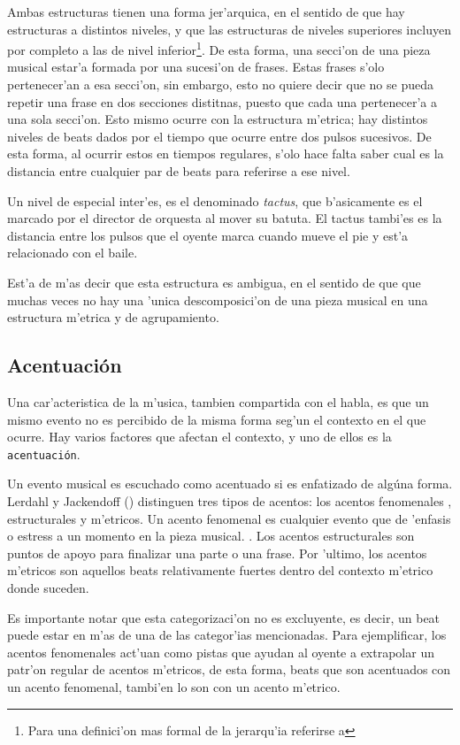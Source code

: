 Ambas estructuras tienen una forma jer'arquica, en el sentido de que hay estructuras a distintos niveles, y que las estructuras de niveles superiores 
incluyen por completo a las de nivel inferior\footnote{Para una definici'on mas formal de la jerarqu'ia referirse a \cita}. De esta forma, una secci'on
de una pieza musical estar'a formada por una sucesi'on de frases. Estas frases s'olo pertenecer'an a esa secci'on, sin embargo, esto no quiere decir
que no se pueda repetir una frase en dos secciones distitnas, puesto que cada una pertenecer'a a una sola secci'on. 
Esto mismo ocurre con la estructura m'etrica; hay distintos niveles de beats dados por el tiempo que ocurre entre dos pulsos sucesivos. De esta forma, al 
ocurrir estos en tiempos regulares, s'olo hace falta saber cual es la distancia entre cualquier par de beats para referirse a ese nivel. 

Un nivel de especial inter'es, es el denominado \emph{tactus}, que b'asicamente es el marcado por el director de orquesta al mover su batuta. 
El tactus tambi'es es la distancia entre los pulsos que el oyente marca cuando mueve el pie y est'a relacionado con el baile. 

Est'a de m'as decir que esta estructura es ambigua, en el sentido de que que muchas veces no hay una 'unica descomposici'on de una pieza musical 
en una estructura m'etrica y de agrupamiento.


\subsection{Acentuaci\'on}
Una car'acteristica de la m'usica, tambien compartida con el habla, es que un mismo evento no es percibido de la misma forma seg'un
el contexto en el que ocurre. Hay varios factores que afectan el contexto, y uno de ellos es la \texttt{acentuaci\'on}. 

Un evento musical es escuchado como acentuado si es enfatizado de alg\'una forma. Lerdahl y Jackendoff (\cita) distinguen tres tipos de 
acentos: los acentos fenomenales , estructurales y m'etricos.
Un acento fenomenal es cualquier evento que de 'enfasis o estress a un momento en la pieza musical. . Los acentos estructurales son puntos de apoyo para finalizar una parte o una frase. 
Por 'ultimo, los acentos m'etricos son aquellos beats relativamente fuertes dentro del contexto m'etrico donde suceden.\newline
{} 

Es importante notar que esta categorizaci'on no es excluyente, es decir, un beat puede estar en m'as de una de las categor'ias mencionadas.
Para ejemplificar, los acentos fenomenales act'uan como pistas que ayudan al oyente a extrapolar un patr'on regular de acentos m'etricos, 
de esta forma, beats que son acentuados con un acento fenomenal, tambi'en lo son con un acento m'etrico.


